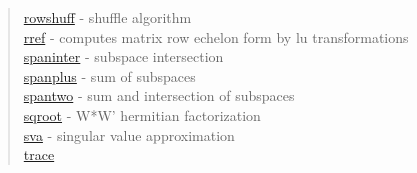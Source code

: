 \begin{quote}
\hyperlink{rowshuff}{rowshuff} - {shuffle algorithm} \\  
\hyperlink{rref}{rref} - {computes  matrix row echelon form by lu transformations} \\  
\hyperlink{spaninter}{spaninter} - {subspace intersection} \\  
\hyperlink{spanplus}{spanplus} - {sum of subspaces} \\  
\hyperlink{spantwo}{spantwo} - {sum and intersection of subspaces} \\  
\hyperlink{sqroot}{sqroot} - {W*W' hermitian factorization} \\  
\hyperlink{sva}{sva} - {singular value approximation} \\  
\hyperlink{trace}{trace}
\end{quote}

% 
% 
% 
% 
% 
% 
% 
% 
% 
% 
% 
% 
% 
% 
% 
% 
% 
% 
% 
% 
% 
% 
% 
% 
% 
% 
% 
% 
